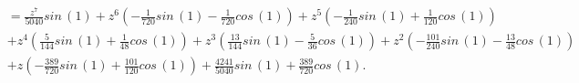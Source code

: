 \begin{description}
\begin{displaymath}
\begin{split}
                             &= \frac{z^{7}}{5040} sin\,{\left (1 \right )} + z^{6} \left(- \frac{1}{720} sin\,{\left (1 \right )} - \frac{1}{720} cos\,{\left (1 \right )}\right) + z^{5} \left(- \frac{1}{240} sin\,{\left (1 \right )} + \frac{1}{120} cos\,{\left (1 \right )}\right) \\
                             &+ z^{4} \left(\frac{5}{144} sin\,{\left (1 \right )} + \frac{1}{48} cos\,{\left (1 \right )}\right) + z^{3} \left(\frac{13}{144} sin\,{\left (1 \right )} - \frac{5}{36} cos\,{\left (1 \right )}\right) + z^{2} \left(- \frac{101}{240} sin\,{\left (1 \right )} - \frac{13}{48} cos\,{\left (1 \right )}\right) \\
                             &+ z \left(- \frac{389}{720} sin\,{\left (1 \right )} + \frac{101}{120} cos\,{\left (1 \right )}\right) + \frac{4241}{5040} sin\,{\left (1 \right )} + \frac{389}{720} cos\,{\left (1 \right )}.
    \end{split}
\end{displaymath}
\end{description}
